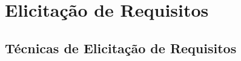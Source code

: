 
\chapter[Elicitação de Requisitos]{Elicitação de Requisitos}
\section{Técnicas de Elicitação de Requisitos}
